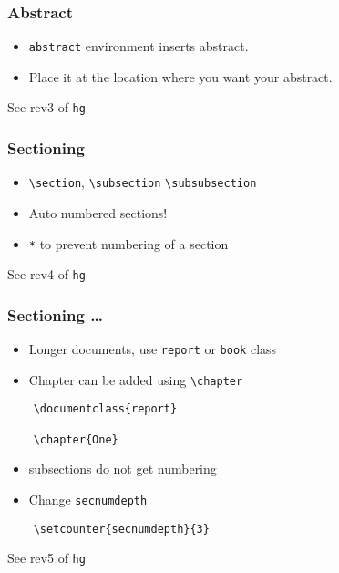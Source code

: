 \documentclass{beamer}
\newcommand{\typ}[1]{\lstinline{#1}}
\begin{document}
\begin{frame}[fragile]
  \frametitle{Abstract}
  \begin{itemize}
  \item \typ{abstract} environment inserts abstract.
  \item Place it at the location where you want your abstract. 
  \end{itemize}
  \tiny See rev3 of \typ{hg}
\end{frame}

\begin{frame}[fragile]
  \frametitle{Sectioning}
  \begin{itemize}
  \item \lstinline{\section}, \lstinline{\subsection}
    \lstinline{\subsubsection}
  \item Auto numbered sections!
  \item \typ{*} to prevent numbering of a section
  \end{itemize}
  \tiny See rev4 of \typ{hg}
\end{frame}

\begin{frame}[fragile]
  \frametitle{Sectioning \ldots}
  \begin{itemize}
  \item Longer documents, use \lstinline{report} or \lstinline{book}
    class
  \item Chapter can be added using \lstinline{\chapter}
  \end{itemize}
  \begin{lstlisting}
    \documentclass{report}

    \chapter{One}
  \end{lstlisting}
  \begin{itemize}
  \item subsections do not get numbering
  \item Change \lstinline{secnumdepth}
  \end{itemize}
  \begin{lstlisting}
    \setcounter{secnumdepth}{3}
  \end{lstlisting}
   \tiny See rev5 of \typ{hg}
\end{frame}
\end{document}
